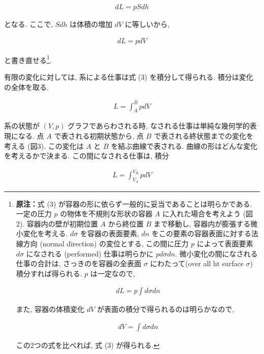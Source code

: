 \begin{align}\tag{2}
dL=pSdh
\end{align}

となる. ここで, $Sdh$ は体積の増加 $dV$ に等しいから,

\begin{align}\tag{3}
dL=pdV
\end{align}

と書き直せる\footnote{\textbf{原注：}式 (3) が容器の形に依らず一般的に妥当であることは明らかである. 一定の圧力 $p$ の物体を不規則な形状の容器 $A$ に入れた場合を考えよう (図2). 容器内の壁が初期位置 $A$ から終位置 $B$ まで移動し, 容器内が膨張する微小変化を考える. $d\sigma$ を容器の表面要素, $dn$ をこの要素の容器表面に対する法線方向 (normal direction) の変位とする, この間に圧力 $p$ によって表面要素 $d\sigma$ になされる (performed) 仕事は明らかに $pd\sigma dn$. 微小変化の間になされる仕事の合計は, さっきのを容器の全表面 $\sigma$ にわたって(over all ht surface $\sigma$) 積分すれば得られる. $p$ は一定なので, 

\begin{align*}
dL=p\int{}{}d\sigma dn
\end{align*}

また, 容器の体積変化 $dV$ が表面の積分で得られるのは明らかなので, 

\begin{align*}
dV=\int{}{}d\sigma dn
\end{align*}

この2つの式を比べれば, 式 (3) が得られる.}.\par

有限の変化に対しては, 系による仕事は式 (3) を積分して得られる. 積分は変化の全体を取る. 

\begin{align}\tag{4}
L=\int_A^BpdV
\end{align}

\par

系の状態が $(V,p)$ グラフであらわされる時, なされる仕事は単純な幾何学的表現になる. 点 $A$ で表される初期状態から, 点 $B$ で表される終状態までの変化を考える (図3). この変化は $A$ と $B$ を結ぶ曲線で表される. 曲線の形はどんな変化を考えるかで決まる. この間になされる仕事は, 積分

\begin{align}\tag{5}
L=\int_{V_{A}}^{V_{B}}pdV
\end{align}

